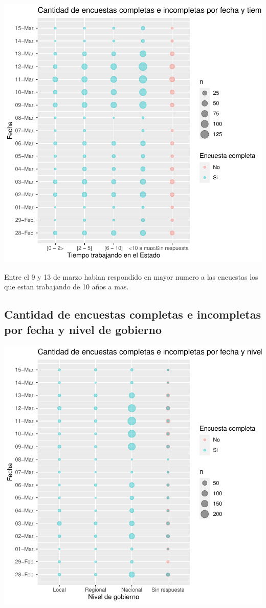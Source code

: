 \documentclass{article}
\begin{document}
\includegraphics{seguimientov3-037}

Entre el 9 y 13 de marzo habian respondido en mayor numero a las encuestas los que estan trabajando de 10 años a mas.

\subsection{Cantidad de encuestas completas e incompletas por fecha y nivel de gobierno}

\includegraphics{seguimientov3-038}
\end{document}
